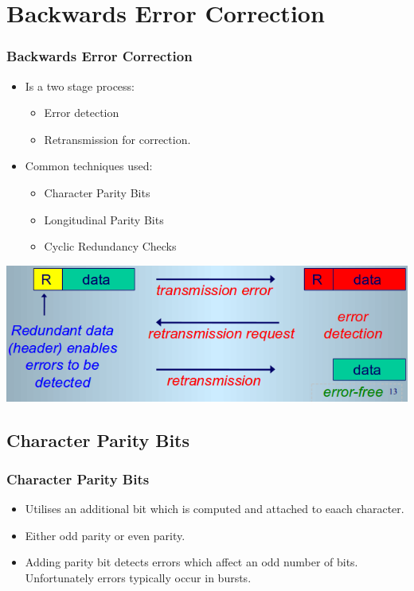 \documentclass{beamer}
\begin{document}
\section{Backwards Error Correction}
\begin{frame}
\frametitle{Backwards Error Correction}
\begin{itemize}
\item Is a two stage process:
\begin{itemize}
\item Error detection
\item Retransmission for correction.
\end{itemize}
\item Common techniques used:
\begin{itemize}
\item Character Parity Bits
\item Longitudinal Parity Bits
\item Cyclic Redundancy Checks
\end{itemize}
\end{itemize}
\includegraphics[scale=0.3]{bec.png}
\end{frame}
\subsection{Character Parity Bits}
\begin{frame}
\frametitle{Character Parity Bits}
\begin{itemize}
\item Utilises an additional bit which is computed and attached to eaach character.
\item Either odd parity or even parity.
\item Adding parity bit detects errors which affect an odd number of bits. Unfortunately errors typically occur in bursts.
\end{itemize}
\end{frame}
\end{document}
